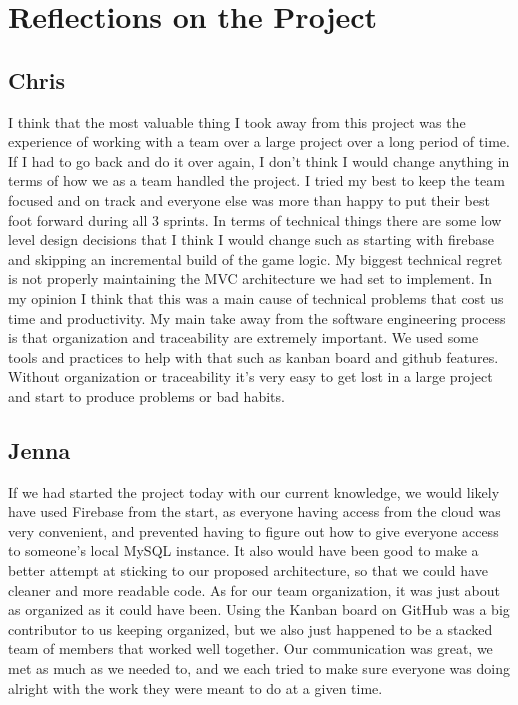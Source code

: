\section{Reflections on the Project}
\subsection{Chris}
I think that the most valuable thing I took away from this project was the experience of working with a team over a large project over a long period of time. If I had to go back and do it over again, I don't think I would change anything in terms of how we as a team handled the project. I tried my best to keep the team focused and on track and everyone else was more than happy to put their best foot forward during all 3 sprints. In terms of technical things there are some low level design decisions that I think I would change such as starting with firebase and skipping an incremental build of the game logic. My biggest technical regret is not properly maintaining the MVC architecture we had set to implement. In my opinion I think that this was a main cause of technical problems that cost us time and productivity. My main take away from the software engineering process is that organization and traceability are extremely important. We used some tools and practices to help with that such as kanban board and github features. Without organization or traceability it's very easy to get lost in a large project and start to produce problems or bad habits.


\subsection{Jenna}
If we had started the project today with our current knowledge, we would likely have used Firebase from the start, as everyone having access from the cloud was very convenient, and prevented having to figure out how to give everyone access to someone's local MySQL instance. It also would have been good to make a better attempt at sticking to our proposed architecture, so that we could have cleaner and more readable code.
As for our team organization, it was just about as organized as it could have been. Using the Kanban board on GitHub was a big contributor to us keeping organized, but we also just happened to be a stacked team of members that worked well together. Our communication was great, we met as much as we needed to, and we each tried to make sure everyone was doing alright with the work they were meant to do at a given time.

